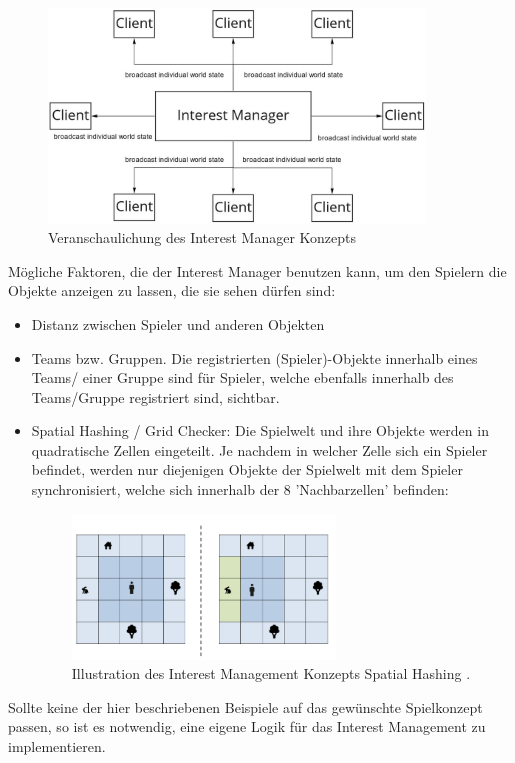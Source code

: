 \begin{figure}[H]
	\centering
	\includegraphics[width=100mm]{images/Interest_Manager.jpg}
	\caption[Interest Manager]{Veranschaulichung des Interest Manager Konzepts}
	\label{pic:Interest_Manager}
\end{figure}

Mögliche Faktoren, die der Interest Manager benutzen kann, um den Spielern die Objekte anzeigen zu lassen, die sie sehen dürfen sind:

\begin{itemize}
	\item Distanz zwischen Spieler und anderen Objekten
	\item Teams bzw. Gruppen. Die registrierten (Spieler)-Objekte innerhalb eines Teams/ einer Gruppe sind für Spieler, welche ebenfalls innerhalb des Teams/Gruppe registriert sind, sichtbar.
	\item Spatial Hashing / Grid Checker: Die Spielwelt und ihre Objekte werden in quadratische Zellen eingeteilt. Je nachdem in welcher Zelle sich ein Spieler befindet, werden nur diejenigen Objekte der Spielwelt mit dem Spieler synchronisiert, welche sich innerhalb der 8 'Nachbarzellen' befinden: 
	\begin{figure}[H]
		\centering
		\includegraphics[width=70mm]{images/interest_management.png}
		\caption[Spatial Hashing]{Illustration des Interest Management Konzepts Spatial Hashing \cite{JeromeRenaux.2017}.}
		\label{pic:interest_management}
	\end{figure}
\end{itemize}

Sollte keine der hier beschriebenen Beispiele auf das gewünschte Spielkonzept passen, so ist es notwendig, eine eigene Logik für das Interest Management zu implementieren.
